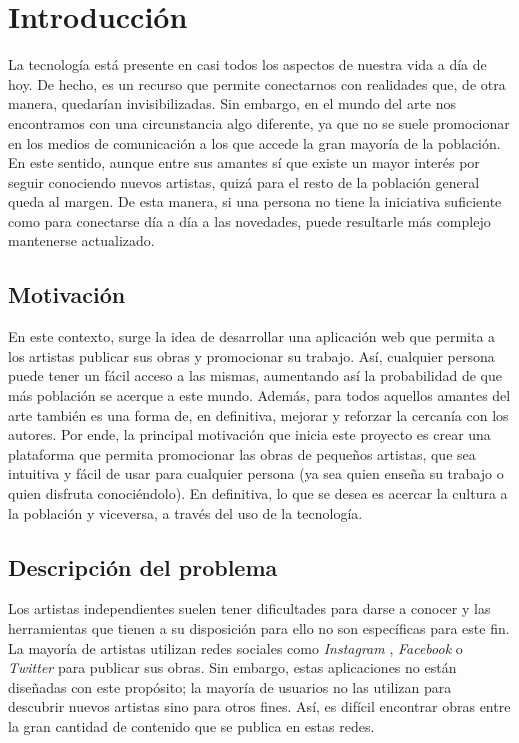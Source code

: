 \chapter{Introducción}

La tecnología está presente en casi todos los aspectos de nuestra vida a día de hoy. De hecho,
es un recurso que permite conectarnos con realidades que, de otra manera, quedarían
invisibilizadas. Sin embargo, en el mundo del arte nos encontramos con una circunstancia algo
diferente, ya que no se suele promocionar en los medios de comunicación a los que accede la
gran mayoría de la población. En este sentido, aunque entre sus amantes sí que existe un
mayor interés por seguir conociendo nuevos artistas, quizá para el resto de la población
general queda al margen. De esta manera, si una persona no tiene la iniciativa suficiente
como para conectarse día a día a las novedades, puede resultarle más complejo mantenerse
actualizado. 
 
\section{Motivación}  
 
En este contexto, surge la idea de desarrollar una aplicación web que permita a los artistas
publicar sus obras y promocionar su trabajo. Así, cualquier persona puede tener un fácil
acceso a las mismas, aumentando así la probabilidad de que más población se acerque a este
mundo. Además, para todos aquellos amantes del arte también es una forma de, en definitiva,
mejorar y reforzar la cercanía con los autores. Por ende, la principal motivación que inicia
este proyecto es crear una plataforma que permita promocionar las obras de pequeños artistas,
que sea intuitiva y fácil de usar para cualquier persona (ya sea quien enseña su trabajo o
quien disfruta conociéndolo). En definitiva, lo que se desea es acercar la cultura a la
población y viceversa, a través del uso de la tecnología.  
 
\section{Descripción del problema} 
 
Los artistas independientes suelen tener dificultades para darse a conocer y las herramientas
que tienen a su disposición para ello no son específicas para este fin. La mayoría de
artistas utilizan redes sociales como \textit{Instagram} \cite{instagram}, \textit{Facebook}
\cite{facebook} o \textit{Twitter} \cite{twitter} para publicar sus obras. Sin embargo, estas
aplicaciones no están diseñadas con este propósito; la mayoría de usuarios no las utilizan
para descubrir nuevos artistas sino para otros fines. Así, es difícil encontrar obras entre
la gran cantidad de contenido que se publica en estas redes.  
 
